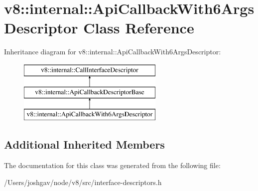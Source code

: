 \hypertarget{classv8_1_1internal_1_1_api_callback_with6_args_descriptor}{}\section{v8\+:\+:internal\+:\+:Api\+Callback\+With6\+Args\+Descriptor Class Reference}
\label{classv8_1_1internal_1_1_api_callback_with6_args_descriptor}
Inheritance diagram for v8\+:\+:internal\+:\+:Api\+Callback\+With6\+Args\+Descriptor\+:\begin{figure}[H]
\begin{center}
\leavevmode
\includegraphics[height=3.000000cm]{classv8_1_1internal_1_1_api_callback_with6_args_descriptor}
\end{center}
\end{figure}
\subsection*{Additional Inherited Members}


The documentation for this class was generated from the following file\+:\begin{DoxyCompactItemize}
\item 
/\+Users/joshgav/node/v8/src/interface-\/descriptors.\+h\end{DoxyCompactItemize}
